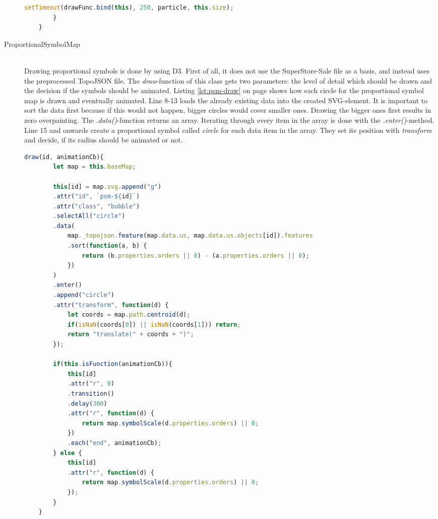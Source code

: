 \begin{description}
\begin{lstlisting}[language=JavaScript, caption={Particles on a dot map getting animated.}, label={lst:dot-draw-animated}]
            setTimeout(drawFunc.bind(this), 250, particle, this.size);
        }
    }
\end{lstlisting}

\item[ProportionalSymbolMap] \hfill \\
Drawing proportional symbols is done by using \ac{D3}. First of all, it does not use the SuperStore-Sale file as a basis, and instead uses the preprocessed TopoJSON file. The \textit{draw}-function of this class gets two parameters: the level of detail which should be drawn and the decision if the symbols should be animated. Listing \ref{lst:psm-draw} on page \pageref{lst:psm-draw} shows how each circle for the proportional symbol map is drawn and eventually animated. Line 8-13 loads the already existing data into the created \ac{SVG}-element. It is important to sort the data first because if this would not happen, bigger circles would cover smaller ones. Drawing the bigger ones first results in zero overpainting. The \textit{.data()}-function returns an array. Iterating through every item in the array is done with the \textit{.enter()}-method. Line 15 and onwards create a proportional symbol called \textit{circle} for each data item in the array. They set its position with \textit{transform} and decide, if its radius should be animated or not.

\begin{lstlisting}[language=JavaScript, caption={The draw-function of the ProportionalSymbolMap-class}, label={lst:psm-draw}]
    draw(id, animationCb){
        let map = this.baseMap;

        this[id] = map.svg.append("g")
        .attr("id", `psm-${id}`)
        .attr("class", "bubble")
        .selectAll("circle")
        .data(
            map._topojson.feature(map.data.us, map.data.us.objects[id]).features
            .sort(function(a, b) {
                return (b.properties.orders || 0) - (a.properties.orders || 0);
            })
        )
        .enter()
        .append("circle")
        .attr("transform", function(d) {
            let coords = map.path.centroid(d);
            if(isNaN(coords[0]) || isNaN(coords[1])) return;
            return "translate(" + coords + ")";
        });

        if(this.isFunction(animationCb)){
            this[id]
            .attr("r", 0)
            .transition()
            .delay(300)
            .attr("r", function(d) {
                return map.symbolScale(d.properties.orders) || 0;
            })
            .each("end", animationCb);
        } else {
            this[id]
            .attr("r", function(d) {
                return map.symbolScale(d.properties.orders) || 0;
            });
        }
    }
\end{lstlisting}


\end{description}
